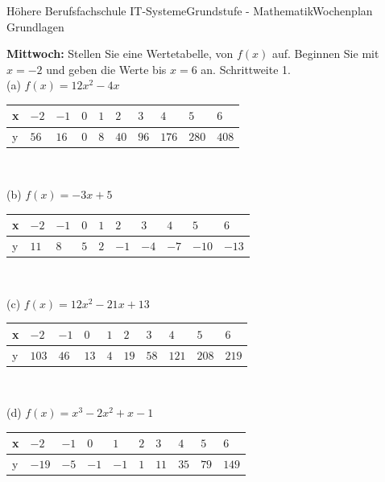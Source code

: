 \documentclass[oneside,openany,headings=optiontotoc,11pt,numbers=noenddot]{scrreprt}
\begin{document}
\begin{worksheet}{Höhere Berufsfachschule IT-Systeme}{Grundstufe - Mathematik}{Wochenplan Grundlagen}
		\begin{framed}
			\noindent
			\textbf{Mittwoch:} Stellen Sie eine Wertetabelle, von \(f(x)\) auf. Beginnen Sie mit \(x = -2\) und geben die Werte bis \(x = 6\) an. Schrittweite 1.\\
			(a) \(f(x) = 12x^2 - 4x\)\\
			\begin{tabularx}{\textwidth}{l|M|M|M|M|M|M|M|M|M}
				x & \(-2\) & \(-1\) & \(0\) & \(1\) & \(2\) & \(3\) & \(4\) & \(5\) & \(6\)\\
				\hline
				y & \(56\) & \(16\) & \(0\) & \(8\) & \(40\) & \(96\) & \(176\) & \(280\) & \(408\)\\ 
			\end{tabularx}\\
			\par\noindent
			(b) \(f(x) = -3x + 5\)\\
			\begin{tabularx}{\textwidth}{l|M|M|M|M|M|M|M|M|M}
				x & \(-2\) & \(-1\) & \(0\) & \(1\) & \(2\) & \(3\) & \(4\) & \(5\) & \(6\)\\
				\hline
				y & \(11\) & \(8\) & \(5\) & \(2\) & \(-1\) & \(-4\) & \(-7\) & \(-10\) & \(-13\)\\  
			\end{tabularx}\\
			\par\noindent
			(c) \(f(x) = 12x^2-21x+13\)\\
			\begin{tabularx}{\textwidth}{l|M|M|M|M|M|M|M|M|M}
				x & \(-2\) & \(-1\) & \(0\) & \(1\) & \(2\) & \(3\) & \(4\) & \(5\) & \(6\)\\
				\hline
				y & \(103\) & \(46\) & \(13\) & \(4\) & \(19\) & \(58\) & \(121\) & \(208\) & \(219\)\\ 
			\end{tabularx}\\
			\par\noindent
			(d) \(f(x) = x^3 - 2x^2 + x - 1\)\\
			\begin{tabularx}{\textwidth}{l|M|M|M|M|M|M|M|M|M}
				x & \(-2\) & \(-1\) & \(0\) & \(1\) & \(2\) & \(3\) & \(4\) & \(5\) & \(6\)\\
				\hline
				y & \(-19\) & \(-5\) & \(-1\) & \(-1\) & \(1\) & \(11\) & \(35\) & \(79\) & \(149\)\\ 
			\end{tabularx}\\
		\end{framed}

\end{worksheet}
\end{document}

